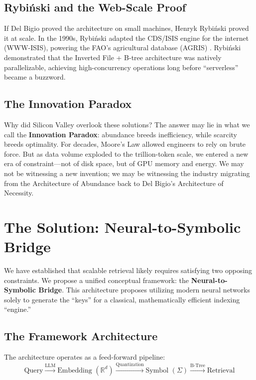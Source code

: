 \documentclass[manuscript,screen,nonacm]{acmart}
\begin{document}
\subsection{Rybi\'{n}ski and the Web-Scale Proof}

If Del Bigio proved the architecture on small machines, Henryk Rybi\'{n}ski proved it at scale. In the 1990s, Rybi\'{n}ski adapted the CDS/ISIS engine for the internet (WWW-ISIS), powering the FAO's agricultural database (AGRIS) \cite{rybinski1999}. Rybi\'{n}ski demonstrated that the Inverted File + B-tree architecture was natively parallelizable, achieving high-concurrency operations long before ``serverless'' became a buzzword.

\subsection{The Innovation Paradox}

Why did Silicon Valley overlook these solutions? The answer may lie in what we call the \textbf{Innovation Paradox}: abundance breeds inefficiency, while scarcity breeds optimality. For decades, Moore's Law allowed engineers to rely on brute force. But as data volume exploded to the trillion-token scale, we entered a new era of constraint---not of disk space, but of GPU memory and energy. We may not be witnessing a new invention; we may be witnessing the industry migrating from the Architecture of Abundance back to Del Bigio's Architecture of Necessity.

\section{The Solution: Neural-to-Symbolic Bridge}

We have established that scalable retrieval likely requires satisfying two opposing constraints. We propose a unified conceptual framework: the \textbf{Neural-to-Symbolic Bridge}. This architecture proposes utilizing modern neural networks solely to generate the ``keys'' for a classical, mathematically efficient indexing ``engine.''

\subsection{The Framework Architecture}

The architecture operates as a feed-forward pipeline:
\[ \text{Query} \xrightarrow{\text{LLM}} \text{Embedding } (\mathbb{R}^d) \xrightarrow{\text{Quantization}} \text{Symbol } (\Sigma) \xrightarrow{\text{B-Tree}} \text{Retrieval} \]
\end{document}
